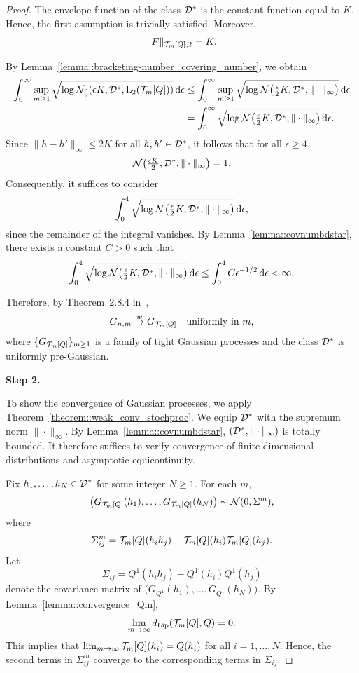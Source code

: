 \begin{proof}
The envelope function of the class $\mathcal{D}^*$ is the constant function equal to $K$. Hence, the first assumption is trivially satisfied. Moreover,
\[
\|F\|_{\mathcal{T}_m[Q],2} = K.
\]

By Lemma~\ref{lemma::bracketing-number_covering_number}, we obtain
\begin{align*}
\int_0^\infty \sup_{m \geq 1}\sqrt{\log \mathcal{N}_{[]}\!\left(\epsilon K, \mathcal{D}^*, \mathrm{L}_2(\mathcal{T}_m[Q]) \right)}\,\mathrm{d}\epsilon & \leq
\int_0^\infty \sup_{m \geq 1}\sqrt{\log \mathcal{N}\!\left(\tfrac{\epsilon}{2} K, \mathcal{D}^*, \|\cdot\|_\infty \right)}\,\mathrm{d}\epsilon \\
& = \int_0^\infty \sqrt{\log \mathcal{N}\!\left(\tfrac{\epsilon}{2} K, \mathcal{D}^*, \|\cdot\|_\infty \right)}\,\mathrm{d}\epsilon.
\end{align*}
Since $\|h-h'\|_\infty \leq 2K$ for all $h,h' \in \mathcal{D}^*$, it follows that for all $\epsilon \geq 4$,
\[
\mathcal{N}\!\left(\tfrac{\epsilon K}{2}, \mathcal{D}^*, \|\cdot\|_\infty\right)=1.
\]
Consequently, it suffices to consider
\[
\int_0^4 \sqrt{\log \mathcal{N}\!\left(\tfrac{\epsilon}{2} K, \mathcal{D}^*, \|\cdot\|_\infty \right)}\,\mathrm{d}\epsilon,
\]
since the remainder of the integral vanishes. By Lemma~\ref{lemma::covnumbdstar}, there exists a constant $C>0$ such that
\[
\int_0^4 \sqrt{\log \mathcal{N}\!\left(\tfrac{\epsilon}{2} K, \mathcal{D}^*, \|\cdot\|_\infty \right)}\,\mathrm{d}\epsilon
\leq
\int_0^4 C \epsilon^{-1/2}\,\mathrm{d}\epsilon < \infty.
\]

Therefore, by Theorem~2.8.4 in~\cite{van1996weak},
\[
G_{n,m} \overset{w}{\to} G_{\mathcal{T}_m[Q]} \quad \text{uniformly in } m,
\]
where $\{G_{\mathcal{T}_m[Q]}\}_{m\ge1}$ is a family of tight Gaussian processes and the class $\mathcal{D}^*$ is uniformly pre-Gaussian.

\textbf{Step 2.}

To show the convergence of Gaussian processes, we apply Theorem~\ref{theorem::weak_conv_stochproc}. We equip $\mathcal{D}^*$ with the supremum norm $\|\cdot\|_\infty$. By Lemma~\ref{lemma::covnumbdstar}, $(\mathcal{D}^*,\|\cdot\|_\infty)$ is totally bounded. It therefore suffices to verify convergence of finite-dimensional distributions and asymptotic equicontinuity.

Fix $h_1,\dots,h_N \in \mathcal{D}^*$ for some integer $N\geq 1$. For each $m$,
\[
\bigl(G_{\mathcal{T}_m[Q]}(h_1),\dots,G_{\mathcal{T}_m[Q]}(h_N)\bigr)
\sim \mathcal{N}(0,\Sigma^m),
\]
where
\[
\Sigma^m_{ij}
=
\mathcal{T}_m[Q](h_i h_j) - \mathcal{T}_m[Q](h_i)\mathcal{T}_m[Q](h_j).
\]
Let
\[
\Sigma_{ij}
=
Q^{1}(h_i h_j) - Q^{1}(h_i)Q^{1}(h_j)
\]
denote the covariance matrix of $\bigl(G_{Q^{1}}(h_1),\dots,G_{Q^{1}}(h_N)\bigr)$. By Lemma~\ref{lemma::convergence_Qm},
\[
\lim_{m \to \infty} d_{\mathrm{Lip}}(\mathcal{T}_m[Q],Q)=0.
\]
This implies that $\lim_{m \to \infty}\mathcal{T}_m[Q](h_i) = Q(h_i)$ for all $i = 1,\dots,N.$ Hence, the second terms in $\Sigma^m_{ij}$ converge to the corresponding terms in $\Sigma_{ij}$.


\end{proof}
